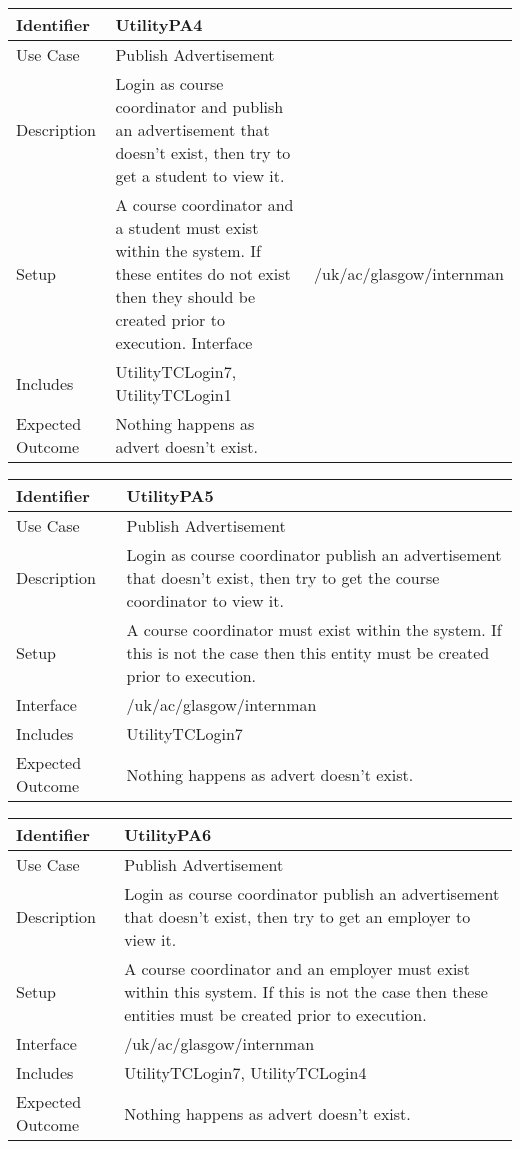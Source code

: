 \vspace{2em}

\begin{tabularx}{\textwidth}{|T|L|}
\hline
Identifier & UtilityPA4\\
\hline
Use Case & Publish Advertisement \\
\hline
Description & Login as course coordinator and  publish an advertisement that
doesn't exist, then try to get a student to view it.\\
\hline
Setup & A course coordinator and a student must exist within the
system. If these entites do not exist then they should be created
prior to execution.
\hline
Interface & /uk/ac/glasgow/internman \\
\hline
Includes & UtilityTCLogin7, UtilityTCLogin1 \\
\hline
Expected Outcome & Nothing happens as advert doesn't exist.\\
\hline
\end{tabularx}

\vspace{2em}

\begin{tabularx}{\textwidth}{|T|L|}
\hline
Identifier & UtilityPA5\\
\hline
Use Case & Publish Advertisement \\
\hline
Description & Login as course coordinator publish an advertisement that
doesn't exist, then try to get the course coordinator to view it.\\
\hline
Setup & A course coordinator must exist within the system. If this is
not the case then this entity must be created prior to execution.  \\
\hline
Interface & /uk/ac/glasgow/internman \\
\hline
Includes & UtilityTCLogin7  \\
\hline
Expected Outcome & Nothing happens as advert doesn't exist.\\
\hline
\end{tabularx}

\vspace{2em}

\begin{tabularx}{\textwidth}{|T|L|}
\hline
Identifier & UtilityPA6\\
\hline
Use Case & Publish Advertisement \\
\hline
Description & Login as course coordinator publish an advertisement that
doesn't exist, then try to get an employer to view it.\\
\hline
Setup & A course coordinator and an employer must exist within this
system. If this is not the case then these entities must be created
prior to execution. \\
\hline
Interface & /uk/ac/glasgow/internman \\
\hline
Includes & UtilityTCLogin7, UtilityTCLogin4 \\
\hline
Expected Outcome & Nothing happens as advert doesn't exist.\\
\hline
\end{tabularx}

